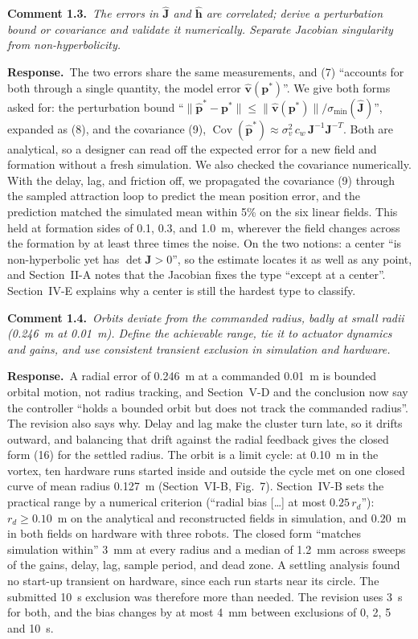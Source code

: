 \documentclass[10pt]{article}
\newcommand{\rev}[1]{#1}                             %
\newcommand{\cmt}[2]{\textbf{Comment #1.}~\textit{#2}\par}
\newcommand{\resp}{\par\textbf{Response.}~}
\begin{document}
\cmt{1.3}{The errors in $\hat{\mathbf{J}}$ and $\hat{\mathbf{h}}$ are correlated; derive a perturbation bound or covariance and validate it numerically. Separate Jacobian singularity from non-hyperbolicity.}

\resp The two errors share the same measurements, and (7) ``accounts for both through a single quantity, the model error $\hat{\mathbf{v}}(\mathbf{p}^*)$''. We give both forms asked for: the perturbation bound ``$\|\hat{\mathbf{p}}^* - \mathbf{p}^*\| \le \|\hat{\mathbf{v}}(\mathbf{p}^*)\|/\sigma_{\min}(\hat{\mathbf{J}})$'', expanded as (8), and the covariance (9), $\operatorname{Cov}(\hat{\mathbf{p}}^*) \approx \sigma_v^2\, c_w\, \mathbf{J}^{-1}\mathbf{J}^{-T}$. Both are analytical, so a designer can read off the expected error for a new field and formation without a fresh simulation. We also checked the covariance numerically. With the delay, lag, and friction off, we propagated the covariance (9) through the sampled attraction loop to predict the mean position error, and the prediction matched the simulated mean within \rev{5}\% on the six linear fields. This held at formation sides of 0.1, 0.3, and 1.0~m, wherever the field changes across the formation by at least three times the noise. On the two notions: a center ``is non-hyperbolic yet has $\det\mathbf{J} > 0$'', so the estimate locates it as well as any point, and Section~II-A notes that the Jacobian fixes the type ``except at a center''. Section~IV-E explains why a center is still the hardest type to classify.

\cmt{1.4}{Orbits deviate from the commanded radius, badly at small radii (0.246~m at 0.01~m). Define the achievable range, tie it to actuator dynamics and gains, and use consistent transient exclusion in simulation and hardware.}

\resp A radial error of 0.246~m at a commanded 0.01~m is bounded orbital motion, not radius tracking, and Section~V-D and the conclusion now say the controller ``holds a bounded orbit but does not track the commanded radius''. The revision also says why. Delay and lag make the cluster turn late, so it drifts outward, and balancing that drift against the radial feedback gives the closed form (16) for the settled radius. The orbit is a limit cycle: at 0.10~m in the vortex, ten hardware runs started inside and outside the cycle met on one closed curve of mean radius \rev{0.127}~m (Section~VI-B, Fig.~7). Section~IV-B sets the practical range by a numerical criterion (``radial bias [\ldots] at most $0.25\,r_d$''): $r_d \ge \rev{0.10}$~m on the analytical and reconstructed fields in simulation, and $\rev{0.20}$~m in both fields on hardware with three robots. The closed form ``matches simulation within'' \rev{3}~mm at every radius and a median of \rev{1.2}~mm across sweeps of the gains, delay, lag, sample period, and dead zone. A settling analysis found no start-up transient on hardware, since each run starts near its circle. The submitted 10~s exclusion was therefore more than needed. The revision uses \rev{3}~s for both, and the bias changes by at most 4~mm between exclusions of 0, 2, 5 and 10~s.
\end{document}
